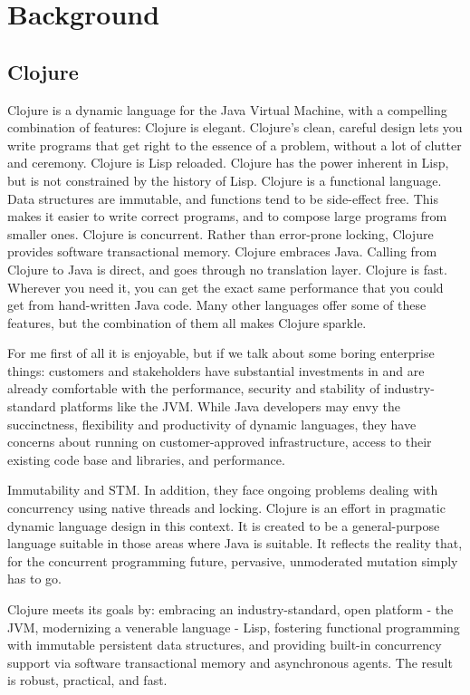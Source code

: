 \chapter{Background}
\label{chap:background}

\section{Clojure}

Clojure is a dynamic language for the Java Virtual Machine, with a compelling
combination of features: Clojure is elegant. Clojure's clean, careful design
lets you write programs that get right to the essence of a problem, without a
lot of clutter and ceremony. Clojure is Lisp reloaded. Clojure has the power
inherent in Lisp, but is not constrained by the history of Lisp. Clojure is a
functional language. Data structures are immutable, and functions tend to be
side-effect free. This makes it easier to write correct programs, and to compose
large programs from smaller ones. Clojure is concurrent. Rather than error-prone
locking, Clojure provides software transactional memory. Clojure embraces Java.
Calling from Clojure to Java is direct, and goes through no translation layer.
Clojure is fast. Wherever you need it, you can get the exact same performance
that you could get from hand-written Java code. Many other languages offer some
of these features, but the combination of them all makes Clojure sparkle.

For me first of all it is enjoyable, but if we talk about some boring enterprise
things: customers and stakeholders have substantial investments in and are
already comfortable with the performance, security and stability of
industry-standard platforms like the JVM. While Java developers may envy the
succinctness, flexibility and productivity of dynamic languages, they have
concerns about running on customer-approved infrastructure, access to their
existing code base and libraries, and performance.

Immutability and STM. In addition, they face ongoing problems dealing with
concurrency using native threads and locking. Clojure is an effort in pragmatic
dynamic language design in this context. It is created to be a general-purpose
language suitable in those areas where Java is suitable. It reflects the reality
that, for the concurrent programming future, pervasive, unmoderated mutation
simply has to go.

Clojure meets its goals by: embracing an industry-standard, open platform - the
JVM, modernizing a venerable language - Lisp, fostering functional programming
with immutable persistent data structures, and providing built-in concurrency
support via software transactional memory and asynchronous agents. The result is
robust, practical, and fast.

